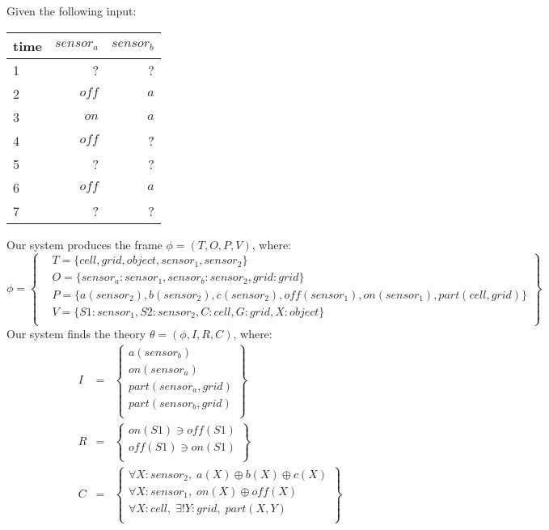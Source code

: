 
Given the following input:
\begin{table}[ht!]
\begin{center}
\begin{tabular}{|l|r|r|}
\hline
time & $\mathit{sensor}_a$& $\mathit{sensor}_b$\\
\hline
1 & ?& ? \\
2 & $\mathit{off}$& $\mathit{a}$ \\
3 & $\mathit{on}$& $\mathit{a}$ \\
4 & $\mathit{off}$& ? \\
5 & ?& ? \\
6 & $\mathit{off}$& $\mathit{a}$ \\
7 & ?& ? \\
\hline
\end{tabular}
\end{center}
\end{table}

Our system produces the frame $\phi = (T, O, P, V)$, where:
\begin{equation*}
\phi = \left \{
\begin{aligned}
& T = \{ 
cell,grid,object,sensor_1,sensor_2
\}\\
& O = \{
\mathit{sensor}_a: sensor_1,\mathit{sensor}_b: sensor_2,\mathit{grid}: grid
\}\\
& P = \{
\mathit{a}(sensor_2),\mathit{b}(sensor_2),\mathit{c}(sensor_2),\mathit{off}(sensor_1),\mathit{on}(sensor_1),\mathit{part}(cell, grid)
\}\\
& V = \{
S1: sensor_1,S2: sensor_2,C: cell,G: grid,X: object
\}\\
\end{aligned}\right\}
\end{equation*}
Our system finds the theory $\theta = (\phi, I, R, C)$, where:
\begin{eqnarray*}
I & = & \left\{ \begin{array}{l}
\mathit{a}(\mathit{sensor}_b)\\
\mathit{on}(\mathit{sensor}_a)\\
\mathit{part}(\mathit{sensor}_a,\mathit{grid})\\
\mathit{part}(\mathit{sensor}_b,\mathit{grid})\\
\end{array}\right\}\\
R & = &  \left\{ \begin{array}{l}
\mathit{on}(\mathit{S}1) \ni \mathit{off}(\mathit{S}1)\\
\mathit{off}(\mathit{S}1) \ni \mathit{on}(\mathit{S}1)\\
\end{array}\right\}\\
C & = & \left\{ \begin{array}{l}
\forall X : sensor_2,\;\mathit{a}(X) \oplus \mathit{b}(X) \oplus \mathit{c}(X)\\
\forall X : sensor_1,\;\mathit{on}(X) \oplus \mathit{off}(X)\\
\forall X : cell, \; \exists ! Y : grid, \; part(X, Y) \\
\end{array}\right\}\\
\end{eqnarray*}

